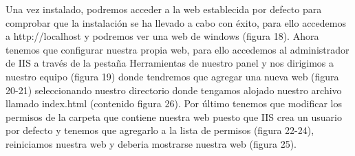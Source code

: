 \documentclass[a4paper, 11pt]{article} %
\begin{document}
Una vez instalado, podremos acceder a la web establecida por defecto para comprobar que la instalación se ha llevado a cabo con éxito, para ello accedemos a http://localhost y podremos ver una web de windows (figura 18). Ahora tenemos que configurar nuestra propia web, para ello accedemos al administrador de IIS a través de la pestaña Herramientas de nuestro panel y nos dirigimos a nuestro equipo (figura 19) donde tendremos que agregar una nueva web (figura 20-21) seleccionando nuestro directorio donde tengamos alojado nuestro archivo llamado index.html (contenido figura 26). Por último tenemos que modificar los permisos de la carpeta que contiene nuestra web puesto que IIS crea un usuario por defecto y tenemos que agregarlo a la lista de permisos (figura 22-24), reiniciamos nuestra web y deberia mostrarse nuestra web (figura 25).
\end{document}
